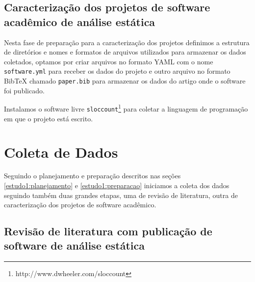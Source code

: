
\subsection{Caracterização dos projetos de software acadêmico de análise estática}

Nesta fase de preparação para a caracterização dos projetos definimos a
estrutura de diretórios e nomes e formatos de arquivos utilizados para
armazenar os dados coletados, optamos por criar arquivos no formato YAML com o
nome \texttt{software.yml} para receber os dados do projeto e outro arquivo no
formato BibTeX chamado \texttt{paper.bib} para armazenar os dados do artigo
onde o software foi publicado.


Instalamos o software livre
\texttt{sloccount}\footnote{http://www.dwheeler.com/sloccount} para coletar a
linguagem de programação em que o projeto está escrito.



\section{Coleta de Dados} \label{estudo1:coleta} %

Seguindo o planejamento e preparação descritos nas seções
\ref{estudo1:planejamento} e \ref{estudo1:preparacao} iniciamos a coleta dos
dados seguindo também duas grandes etapas, uma de revisão de literatura, outra
de caracterização dos projetos de software acadêmico.

\subsection{Revisão de literatura com publicação de software de análise estática}

